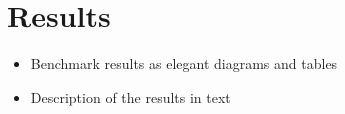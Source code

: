 
\cleardoubleoddpage
\chapter{Results}
\label{sec:results}

\begin{itemize}
    \item Benchmark results as elegant diagrams and tables
    \item Description of the results in text
\end{itemize}

